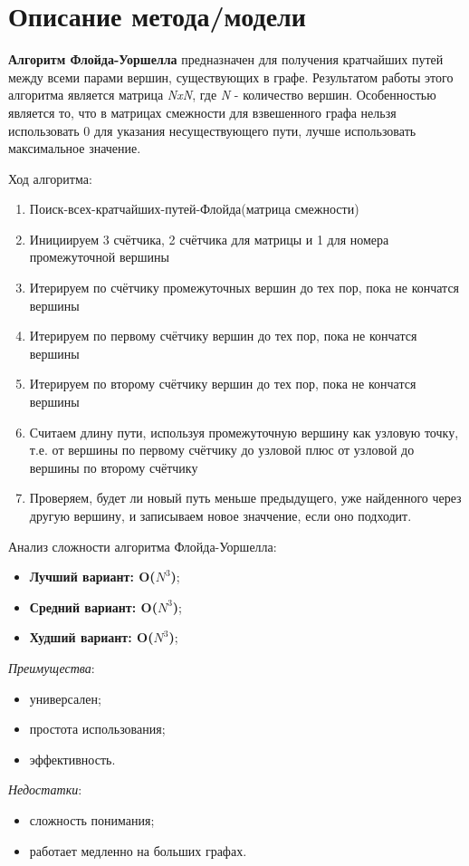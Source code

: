 \documentclass[12pt, a4paper]{report}
\begin{document}
	\section*{Описание метода/модели}
	\large
	\textbf{Алгоритм Флойда-Уоршелла} предназначен для получения кратчайших путей между всеми парами вершин, существующих в графе. Результатом работы этого алгоритма является матрица \textit{NxN}, где \textit{N} - количество вершин. Особенностью является то, что в матрицах смежности для взвешенного графа нельзя использовать 0 для указания несуществующего пути, лучше использовать максимальное значение. \par
	Ход алгоритма:
	\begin{enumerate}
		\item Поиск-всех-кратчайших-путей-Флойда(матрица смежности)
		\item Инициируем 3 счётчика, 2 счётчика для матрицы и 1 для номера промежуточной вершины
		\item Итерируем по счётчику промежуточных вершин до тех пор, пока не кончатся вершины
		\item Итерируем по первому счётчику вершин до тех пор, пока не кончатся вершины
		\item Итерируем по второму счётчику вершин до тех пор, пока не кончатся вершины
		\item Считаем длину пути, используя промежуточную вершину как узловую точку, т.е. от вершины по первому счётчику до узловой плюс от узловой до вершины по второму счётчику
		\item Проверяем, будет ли новый путь меньше предыдущего, уже найденного через другую вершину, и записываем новое значчение, если оно подходит.
	\end{enumerate}
	\par
	Анализ сложности алгоритма Флойда-Уоршелла:
	\begin{itemize}
		\item \textbf{Лучший вариант: O(\( N^3 \))};
		\item \textbf{Средний вариант: O(\( N^3 \))};
		\item \textbf{Худший вариант: O(\( N^3 \))};
	\end{itemize}
	\par
	\textit{Преимущества}:
	\begin{itemize}
		\item универсален;
		\item простота использования;
		\item эффективность.
	\end{itemize}
	\par
	\textit{Недостатки}:
	\begin{itemize}
		\item сложность понимания;
		\item работает медленно на больших графах.
	\end{itemize}
\end{document}
